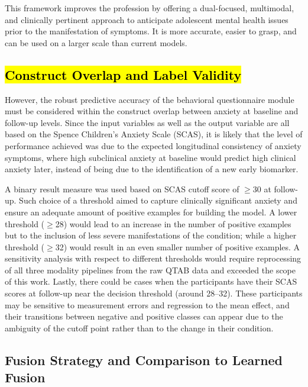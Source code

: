 \documentclass[10pt,letterpaper]{article}
\newcommand{\hlpar}[1]{\leavevmode\colorbox{yellow!30}{\parbox{\dimexpr\linewidth-2\fboxsep\relax}{#1}}\vspace{2pt}}
\begin{document}
                                                                                                                                                                          This framework improves the profession by offering a dual-focused, multimodal, and clinically pertinent approach to anticipate adolescent mental health issues prior to the manifestation of symptoms. It is more accurate, easier to grasp, and can be used on a larger scale than current models.
\subsection*{\hl{Construct Overlap and Label Validity}}


\hlpar{However, the robust predictive accuracy of the behavioral questionnaire module must be considered within the construct overlap between anxiety at baseline and follow-up levels. Since the input variables as well as the output variable are all based on the Spence Children's Anxiety Scale (SCAS), it is likely that the level of performance achieved was due to the expected longitudinal consistency of anxiety symptoms, where high subclinical anxiety at baseline would predict high clinical anxiety later, instead of being due to the identification of a new early biomarker.}

\hlpar{A binary result measure was used based on SCAS cutoff score of $\geq$30 at follow-up. Such choice of a threshold aimed to capture clinically significant anxiety and ensure an adequate amount of positive examples for building the model. A lower threshold ($\geq$28) would lead to an increase in the number of positive examples but to the inclusion of less severe manifestations of the condition; while a higher threshold ($\geq$32) would result in an even smaller number of positive examples. A sensitivity analysis with respect to different thresholds would require reprocessing of all three modality pipelines from the raw QTAB data and exceeded the scope of this work. Lastly, there could be cases when the participants have their SCAS scores at follow-up near the decision threshold (around 28--32). These participants may be sensitive to measurement errors and regression to the mean effect, and their transitions between negative and positive classes can appear due to the ambiguity of the cutoff point rather than to the change in their condition.}
\subsection*{Fusion Strategy and Comparison to Learned Fusion}
\end{document}
